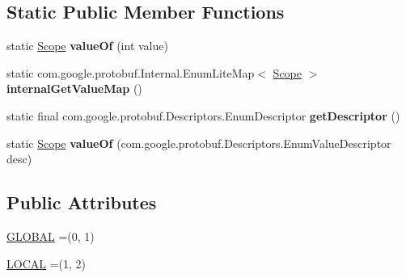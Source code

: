 \subsection*{Static Public Member Functions}
\begin{DoxyCompactItemize}
\item 
\mbox{\label{enumcom_1_1mysql_1_1cj_1_1x_1_1protobuf_1_1_mysqlx_notice_1_1_frame_1_1_scope_aeccefa4a382c2ae4d6ea8b0e15beaaea}} 
static \mbox{\hyperlink{enumcom_1_1mysql_1_1cj_1_1x_1_1protobuf_1_1_mysqlx_notice_1_1_frame_1_1_scope}{Scope}} {\bfseries value\+Of} (int value)
\item 
\mbox{\label{enumcom_1_1mysql_1_1cj_1_1x_1_1protobuf_1_1_mysqlx_notice_1_1_frame_1_1_scope_ada1798bc8940a8c9b1a83b7f4f373a11}} 
static com.\+google.\+protobuf.\+Internal.\+Enum\+Lite\+Map$<$ \mbox{\hyperlink{enumcom_1_1mysql_1_1cj_1_1x_1_1protobuf_1_1_mysqlx_notice_1_1_frame_1_1_scope}{Scope}} $>$ {\bfseries internal\+Get\+Value\+Map} ()
\item 
\mbox{\label{enumcom_1_1mysql_1_1cj_1_1x_1_1protobuf_1_1_mysqlx_notice_1_1_frame_1_1_scope_a41ad03d26a8f9c439aecbe8dda751c3d}} 
static final com.\+google.\+protobuf.\+Descriptors.\+Enum\+Descriptor {\bfseries get\+Descriptor} ()
\item 
\mbox{\label{enumcom_1_1mysql_1_1cj_1_1x_1_1protobuf_1_1_mysqlx_notice_1_1_frame_1_1_scope_a8db459b916ee949e9af44e263a61d16a}} 
static \mbox{\hyperlink{enumcom_1_1mysql_1_1cj_1_1x_1_1protobuf_1_1_mysqlx_notice_1_1_frame_1_1_scope}{Scope}} {\bfseries value\+Of} (com.\+google.\+protobuf.\+Descriptors.\+Enum\+Value\+Descriptor desc)
\end{DoxyCompactItemize}
\subsection*{Public Attributes}
\begin{DoxyCompactItemize}
\item 
\mbox{\hyperlink{enumcom_1_1mysql_1_1cj_1_1x_1_1protobuf_1_1_mysqlx_notice_1_1_frame_1_1_scope_ad6c30a7b16efef3554fe855c44ed06e9}{G\+L\+O\+B\+AL}} =(0, 1)
\item 
\mbox{\hyperlink{enumcom_1_1mysql_1_1cj_1_1x_1_1protobuf_1_1_mysqlx_notice_1_1_frame_1_1_scope_a9e6e59138253e35776c0436403bcd5cd}{L\+O\+C\+AL}} =(1, 2)
\end{DoxyCompactItemize}
